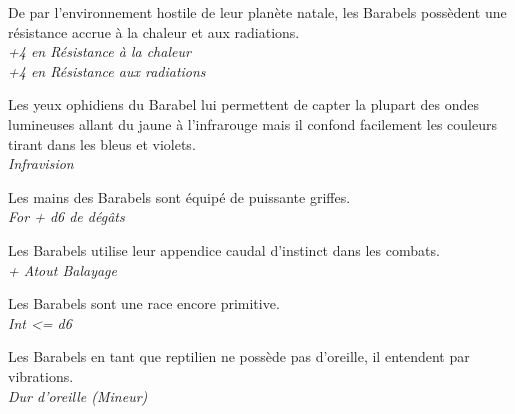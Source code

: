 \begin{description}[align=left]
\item [Enfance difficile] 	%
		De par l’environnement hostile de leur planète natale, les Barabels possèdent une résistance accrue à la chaleur et aux radiations.\\
		\textit{+4 en Résistance à la chaleur}\\
		\textit{+4 en Résistance aux radiations}
\item [\OE{il} Ophidien] 	%
		Les yeux ophidiens du Barabel lui permettent de capter la plupart des ondes lumineuses allant du jaune à l’infrarouge mais il confond facilement les couleurs tirant dans les bleus et violets.\\
		\textit{Infravision}
\item [Arme naturelle]		%
		Les mains des Barabels sont équipé de puissante griffes.\\
		\textit{For + d6 de dégâts}
\item [Balayage]			%
		Les Barabels utilise leur appendice caudal d’instinct dans les combats.\\
		\textit{+ Atout Balayage}
\item [Primitif]			%
		Les Barabels sont une race encore primitive.\\
		\textit{Int <= d6}
\item [Dur d’oreille]		%
		Les Barabels en tant que reptilien ne possède pas d’oreille, il entendent par vibrations.\\
		\textit{Dur d’oreille (Mineur)}
\end{description}